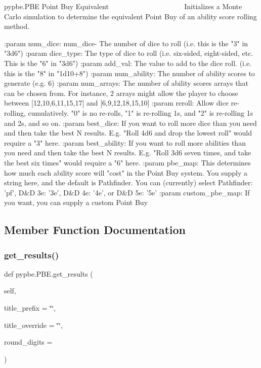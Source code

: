 \begin{DoxyVerb}pypbe.PBE
Point Buy Equivalent
~~~~~~~~~~~~~~~~~~~~
Initializes a Monte Carlo simulation to determine the equivalent
Point Buy of an ability score rolling method.

:param num_dice: num_dice- The number of dice to roll (i.e. this is
    the "3" in "3d6")
:param dice_type: The type of dice to roll (i.e. six-sided,
    eight-sided, etc. This is the "6" in "3d6")
:param add_val: The value to add to the dice roll. (i.e.
    this is the "8" in "1d10+8")
:param num_ability: The number of ability scores to generate (e.g. 6)
:param num_arrays: The number of ability scores arrays that can be
    chosen from. For instance, 2 arrays might allow the player to
    choose between [12,10,6,11,15,17] and [6,9,12,18,15,10]
:param reroll: Allow dice re-rolling, cumulatively. "0" is no re-rolls,
    "1" is re-rolling 1s, and "2" is re-rolling 1s and 2s, and so on.
:param best_dice: If you want to roll more dice than you need
    and then take the best N results. E.g. "Roll 4d6 and drop the
    lowest roll" would require a "3" here.
:param best_ability: If you want to roll more abilities than you need
    and then take the best N results. E.g. "Roll 3d6 seven times,
    and take the best six times" would require a "6" here.
:param pbe_map: This determines how much each ability score will
    "cost" in the Point Buy system. You supply a string here, and
    the default is Pathfinder. You can (currently) select Pathfinder:
    'pf', D&D 3e: '3e', D&D 4e: '4e', or D&D 5e: '5e'
:param custom_pbe_map: If you want, you can supply a custom Point Buy
\end{DoxyVerb}
 

\subsection{Member Function Documentation}
\mbox{\label{classpypbe_1_1_p_b_e_a8b3a78c46718bf12b2cb9e548d81528d}} 
\subsubsection{\texorpdfstring{get\+\_\+results()}{get\_results()}}
{\footnotesize\ttfamily def pypbe.\+P\+B\+E.\+get\+\_\+results (\begin{DoxyParamCaption}\item[{}]{self,  }\item[{}]{title\+\_\+prefix = {\ttfamily \char`\"{}\char`\"{}},  }\item[{}]{title\+\_\+override = {\ttfamily \char`\"{}\char`\"{}},  }\item[{}]{round\+\_\+digits = {} }\end{DoxyParamCaption})}

